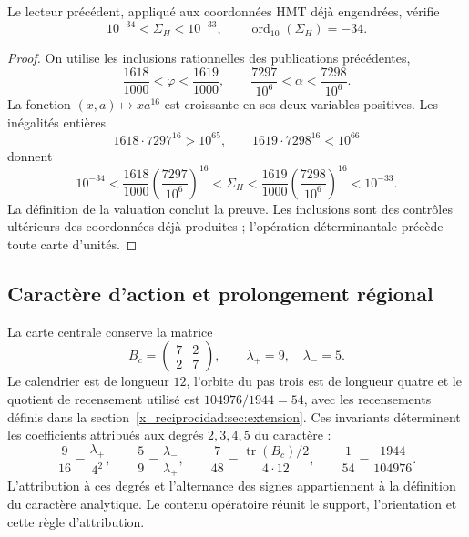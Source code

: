 \begin{theorem}
\label{x_reciprocidad:iv:action:decada}
Le lecteur précédent, appliqué aux coordonnées HMT déjà engendrées,
vérifie
\begin{equation}
 10^{-34}<\Sigma_H<10^{-33},
 \qquad \operatorname{ord}_{10}(\Sigma_H)=-34.
 \label{x_reciprocidad:iv:action:orden-decimal}
\end{equation}
\end{theorem}
\begin{proof}
On utilise les inclusions rationnelles des publications
précédentes,
\begin{equation}
 \frac{1618}{1000}<\varphi<\frac{1619}{1000},
 \qquad
 \frac{7297}{10^6}<\alpha<\frac{7298}{10^6}.
 \label{x_reciprocidad:iv:action:intervalos}
\end{equation}
La fonction \((x,a)\mapsto xa^{16}\) est croissante en ses deux
variables positives. Les inégalités entières
\[
 1618\cdot7297^{16}>10^{65},
 \qquad 1619\cdot7298^{16}<10^{66}
\]
donnent
\[
 10^{-34}
 <\frac{1618}{1000}\left(\frac{7297}{10^6}\right)^{16}
 <\Sigma_H
 <\frac{1619}{1000}\left(\frac{7298}{10^6}\right)^{16}
 <10^{-33}.
\]
La définition de la valuation conclut la preuve. Les inclusions
sont des contrôles ultérieurs des coordonnées déjà produites ;
l’opération déterminantale précède toute carte d’unités.
\end{proof}

\subsection{Caractère d’action et prolongement régional}
\label{x_reciprocidad:iv:action:caracter}

La carte centrale conserve la matrice
\[
 B_c=\begin{pmatrix}7&2\\2&7\end{pmatrix},
 \qquad\lambda_+=9,\quad\lambda_-=5.
\]
Le calendrier est de longueur \(12\), l’orbite du pas trois est de
longueur quatre et le quotient de recensement utilisé est
\(104976/1944=54\), avec les recensements définis dans la
section~\ref{x_reciprocidad:sec:extension}. Ces invariants déterminent les coefficients
attribués aux degrés \(2,3,4,5\) du caractère :
\begin{equation}
 \frac9{16}=\frac{\lambda_+}{4^2},\qquad
 \frac59=\frac{\lambda_-}{\lambda_+},\qquad
 \frac7{48}=\frac{\operatorname{tr}(B_c)/2}{4\cdot12},
 \qquad
 \frac1{54}=\frac{1944}{104976}.
 \label{x_reciprocidad:iv:action:coeficientes}
\end{equation}
L’attribution à ces degrés et l’alternance des signes appartiennent
à la définition du caractère analytique. Le contenu opératoire
réunit le support, l’orientation et cette règle d’attribution.

